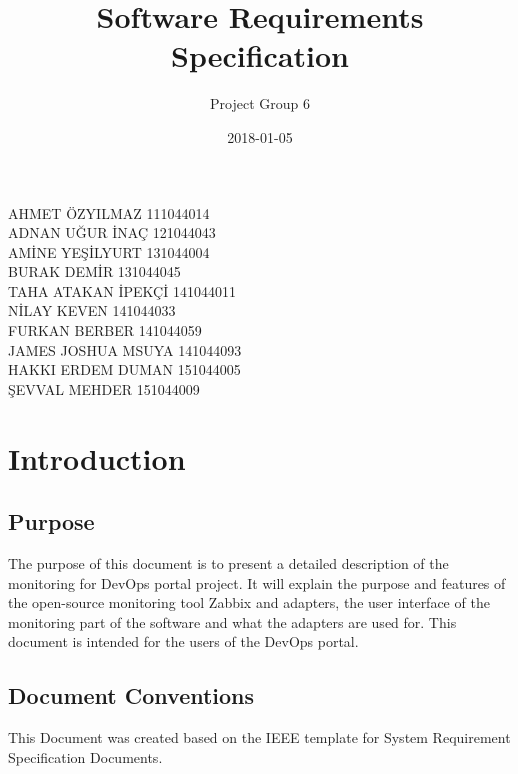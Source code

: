 \documentclass{article}
\newcommand*{\TitleFont}{%
      \usefont{\encodingdefault}{\rmdefault}{b}{n}%
      \fontsize{40}{20}%
      \selectfont}
\newcommand*{\SubTitleFont}{%
      \usefont{\encodingdefault}{\rmdefault}{b}{n}%
      \fontsize{24}{20}%
      \selectfont}
\begin{document}
\title{\TitleFont Software Requirements Specification}
\date{2018-01-05}
\author{\SubTitleFont Project Group 6\\}

 \maketitle

\begin{center}
AHMET ÖZYILMAZ 111044014 \\
ADNAN UĞUR İNAÇ 121044043 \\
AMİNE YEŞİLYURT 131044004 \\
BURAK DEMİR 131044045 \\
TAHA ATAKAN İPEKÇİ 141044011 \\
NİLAY KEVEN 141044033 \\
FURKAN BERBER 141044059 \\
JAMES JOSHUA MSUYA 141044093 \\
HAKKI ERDEM DUMAN 151044005 \\
ŞEVVAL MEHDER 151044009 \\
\end{center}


\newpage
\tableofcontents
\newpage



\section{Introduction}

     \subsection{Purpose}
   
     The purpose of this document is to present a detailed description of the monitoring for DevOps portal project. It will explain the purpose and features of the open-source monitoring tool Zabbix and adapters, the user interface of the monitoring part of the software and what the adapters are used for. This document is intended for the users of the DevOps portal. 

     \subsection{Document Conventions}
	
     This Document was created based on the IEEE template for System Requirement Specification Documents.
\end{document}
